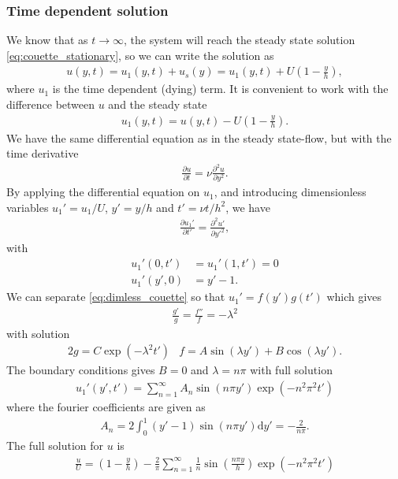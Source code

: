 \documentclass[a4paper,10pt]{article}
\renewcommand{\(}{\left(}
\renewcommand{\)}{\right)}
\newcommand{\dm}[1]{\text{d}#1}
\newcommand{\dpart}[2]{\frac{\partial#1}{\partial#2}}
\newcommand{\dpartt}[2]{\frac{\partial^2#1}{\partial#2^2}}
\begin{document}
\subsubsection{Time dependent solution}
We know that as $t\rightarrow\infty$, the system will reach the steady state solution \eqref{eq:couette_stationary}, so we can write the solution as
\begin{align*}
  u(y,t) = u_1(y,t) + u_s(y) = u_1(y,t) + U\left(1 - \frac{y}{h}\right),
\end{align*}
where $u_1$ is the time dependent (dying) term. It is convenient to work with the difference between $u$ and the steady state
\begin{align*}
  u_1(y,t) = u(y,t) - U\left(1 - \frac{y}{h}\right).
\end{align*}
We have the same differential equation as in the steady state-flow, but with the time derivative
\begin{align*}
  \dpart{u}{t} = \nu\dpartt{u}{y}.
\end{align*}
By applying the differential equation on $u_1$, and introducing dimensionless variables $u_1' = u_1/U$, $y' = y/h$ and $t' = \nu t/h^2$, we have
\begin{align}
  \label{eq:dimless_couette}
  \dpart{u_1'}{t'} = \dpartt{u'}{y'},
\end{align}
with 
\begin{align*}
  u_1'(0,t') &= u_1'(1,t') = 0\\
  u_1'(y',0) &= y' - 1.
\end{align*}
We can separate \eqref{eq:dimless_couette} so that $u_1' = f(y')g(t')$ which gives
\begin{align*}
  \frac{g'}{g} = \frac{f''}{f} = -\lambda^2
\end{align*}
with solution
\begin{alignat}{2}
  g = C\exp(-\lambda^2t') & f = A\sin(\lambda y') + B\cos(\lambda y').
\end{alignat}
The boundary conditions gives $B=0$ and $\lambda=n\pi$ with full solution
\begin{align*}
  u_1'(y',t') = \sum_{n=1}^\infty A_n \sin\left(n\pi y'\right)\exp\left(-n^2\pi^2t'\right)
\end{align*}
where the fourier coefficients are given as
\begin{align*}
  A_n = 2\int_{0}^1 (y' - 1)\sin\left(n\pi y'\right) \dm y' = -\frac{2}{n\pi}.
\end{align*}
The full solution for $u$ is
\begin{align}
  \frac{u}{U} = \left(1 - \frac{y}{h}\right) - \frac{2}{\pi}\sum_{n=1}^\infty \frac{1}{n} \sin\left(\frac{n\pi y}{h}\right)\exp\left(-n^2\pi^2 t'\right)
\end{align}
\end{document}
